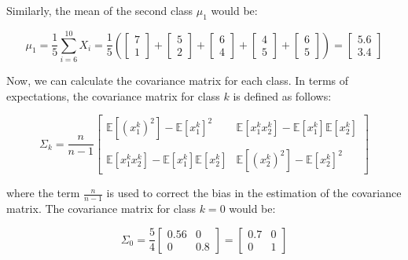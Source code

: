 \documentclass{article}
\begin{document}
Similarly, the mean of the second class $\mu_1$ would be:

\begin{equation}
  \mu_1 = \frac{1}{5} \sum_{i=6}^{10} X_i = \frac{1}{5} \left( \begin{bmatrix} 7 \\ 1 \end{bmatrix} + \begin{bmatrix} 5 \\ 2 \end{bmatrix} + \begin{bmatrix} 6 \\ 4 \end{bmatrix} + \begin{bmatrix} 4 \\ 5 \end{bmatrix} + \begin{bmatrix} 6 \\ 5 \end{bmatrix} \right) = \begin{bmatrix} 5.6 \\ 3.4 \end{bmatrix}
\end{equation}

Now, we can calculate the covariance matrix for each class. In terms of expectations, the covariance matrix for class $k$ is defined as follows:

\begin{equation}
  \Sigma_k = \frac{n}{n - 1}\begin{bmatrix}
    \mathbb{E}[(x^k_1)^2] - \mathbb{E}[x^k_1]^2 & \mathbb{E}[x^k_1x^k_2] - \mathbb{E}[x^k_1]\mathbb{E}[x^k_2] \\
    \\
    \mathbb{E}[x^k_1x^k_2] - \mathbb{E}[x^k_1]\mathbb{E}[x^k_2] & \mathbb{E}[(x^k_2)^2] - \mathbb{E}[x^k_2]^2
  \end{bmatrix}
\end{equation}

where the term $\frac{n}{n - 1}$ is used to correct the bias in the estimation of the covariance matrix. The covariance matrix for class $k = 0$ would be:

\begin{equation}
  \Sigma_0 = \frac{5}{4}\begin{bmatrix}
    0.56 & 0 \\
    0 & 0.8
  \end{bmatrix}
  = \begin{bmatrix}
    0.7 & 0 \\
    0 & 1
  \end{bmatrix}
\end{equation}
\end{document}
